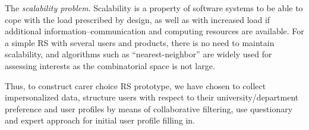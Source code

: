 \documentclass[conference,a4]{IEEEtran}
\begin{document}
The \emph{scalability problem}. Scalability is a property of software systems to be able to cope with the load prescribed by design, as well as with increased load if additional information--communication and computing resources are available.  For a simple RS with several users and products, there is no need to maintain scalability, and algorithms such as ``nearest-neighbor'' are widely used for assessing interests as the combinatorial space is not large. %

Thus, to construct carer choice RS prototype, we have chosen to collect impersonalized data, structure users with respect to their university/department preference and user profiles by means of collaborative filtering, use questionary and expert approach for initial user profile filling in.




\end{document}
